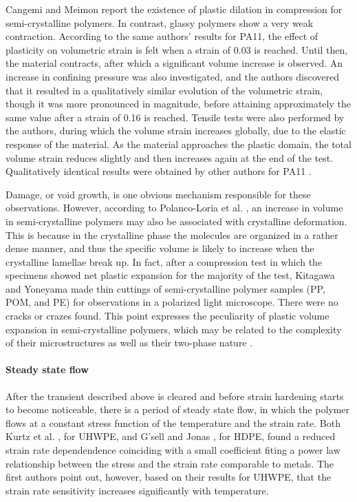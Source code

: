 Cangemi and Meimon \citep{cangemiTwoPhaseModelMechanical2001} report the existence of plastic dilation in compression for semi-crystalline polymers.
In contrast, glassy polymers show a very weak contraction.
According to the same authors' results for PA11, the effect of plasticity on volumetric strain is felt when a strain of \num{0.03} is reached.
Until then, the material contracts, after which a significant volume increase is observed.
An increase in confining pressure was also investigated, and the authors discovered that it resulted in a qualitatively similar evolution of the volumetric strain, though it was more pronounced in magnitude, before attaining approximately the same value after a strain of \num{0.16} is reached.
Tensile tests were also performed by the authors, during which the volume strain increases globally, due to the elastic response of the material.
As the material approaches the plastic domain, the total volume strain reduces slightly and then increases again at the end of the test.
Qualitatively identical results were obtained by other authors for PA11 \citep{marchalInfluenceCheminChargement1996}.

Damage, or void growth, is one obvious mechanism responsible for these observations.
However, according to Polanco-Loria et al. \citep{polanco-loriaConstitutiveModelThermoplastics2010}, an increase in volume in semi-crystalline polymers may also be associated with crystalline deformation.
This is because in the crystalline phase the molecules are organized in a rather dense manner, and thus the specific volume is likely to increase when the crystalline lamellae break up.
In fact, after a compression test in which the specimens showed net plastic expansion for the majority of the test, Kitagawa and Yoneyama \citep{kitagawaPlasticDilatationDue1988} made thin cuttings of semi-crystalline polymer samples (PP, POM, and PE) for observations in a polarized light microscope.
There were no cracks or crazes found.
This point expresses the peculiarity of plastic volume expansion in semi-crystalline polymers, which may be related to the complexity of their microstructures as well as their two-phase nature \citep{cangemiTwoPhaseModelMechanical2001}.

\paragraph{Steady state flow}

After the transient described above is cleared and before strain hardening starts to become noticeable, there is a period of steady state flow, in which the polymer flows at a constant stress function of the temperature and the strain rate.
Both Kurtz et al. \citep{kurtzThermomechanicalBehaviorVirgin2002}, for UHWPE, and G'sell and Jonas \citep{gsellDeterminationPlasticBehaviour1979}, for HDPE, found a reduced strain rate dependendence coinciding with a small coefficient fiting a power law relationship between the stress and the strain rate comparable to metals.
The first authors point out, however, based on their results for UHWPE, that the strain rate sensitivity increases significantly with temperature.

